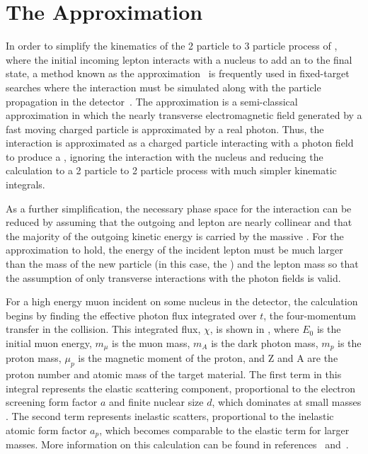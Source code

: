 \section{The \ww Approximation}
\label{sec:wwApprox}
In order to simplify the kinematics of the 2 particle to 3 particle process of \dbrem, where the initial incoming lepton interacts with a nucleus to add an \aprime to the final state, a method known as the \ww approximation~\cite{vonWeizsacker:1934nji,Williams:1935dka} is frequently used in fixed-target searches where the interaction must be simulated along with the particle propagation in the detector~\cite{Bjorken_2009,Andreas_2012}.
The \ww approximation is a semi-classical approximation in which the nearly transverse electromagnetic field generated by a fast moving charged particle is approximated by a real photon. 
Thus, the interaction is approximated as a charged particle interacting with a photon field to produce a \aprime, ignoring the interaction with the nucleus and reducing the calculation to a 2 particle to 2 particle process with much simpler kinematic integrals.

As a further simplification, the necessary phase space for the interaction can be reduced by assuming that the outgoing \aprime and lepton are nearly collinear and that the majority of the outgoing kinetic energy is carried by the massive \aprime.
For the approximation to hold, the energy of the incident lepton must be much larger than the mass of the new particle (in this case, the \aprime) and the lepton mass so that the assumption of only transverse interactions with the photon fields is valid. 

For a high energy muon incident on some nucleus in the detector, the calculation begins by finding the effective photon flux integrated over $t$, the four-momentum transfer in the collision. 
This integrated flux, $\chi$, is shown in , where $E_0$ is the initial muon energy, $m_\mu$ is the muon mass, $m_A$ is the dark photon mass, $m_p$ is the proton mass, $\mu_p$ is the magnetic moment of the proton, and Z and A are the proton number and atomic mass of the target material.
The first term in this integral represents the  elastic scattering component, proportional to the electron screening form factor $a$ and finite nuclear size $d$, which dominates at small \aprime masses .
The second term represents inelastic scatters, proportional to the inelastic atomic form factor $a_p$, which becomes comparable to the elastic term for larger \aprime masses.
More information on this calculation can be found in references~\cite{kim_1973} and~\cite{tsai_1974}. 

